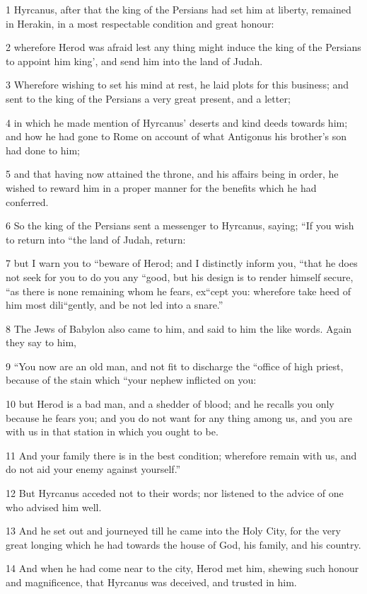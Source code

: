 1 Hyrcanus, after that the king of the Persians had set him at liberty, remained in Herakin, in a most respectable condition and great honour: 

2 wherefore Herod was afraid lest any thing might induce the king of the Persians to appoint him king’, and send him into the land of Judah. 

3 Wherefore wishing to set his mind at rest, he laid plots for this business; and sent to the king of the Persians a very great present, and a letter; 

4 in which he made mention of Hyrcanus’ deserts and kind deeds towards him; and how he had gone to Rome on account of what Antigonus his brother’s son had done to him; 

5 and that having now attained the throne, and his affairs being in order, he wished to reward him in a proper manner for the benefits which he had conferred. 

6 So the king of the Persians sent a messenger to Hyrcanus, saying; “If you wish to return into “the land of Judah, return: 

7 but I warn you to “beware of Herod; and I distinctly inform you, “that he does not seek for you to do you any “good, but his design is to render himself secure, “as there is none remaining whom he fears, ex“cept you: wherefore take heed of him most dili“gently, and be not led into a snare.” 

8 The Jews of Babylon also came to him, and said to him the like words. Again they say to him, 

9 “You now are an old man, and not fit to discharge the “office of high priest, because of the stain which “your nephew inflicted on you: 

10 but Herod is a bad man, and a shedder of blood; and he recalls you only because he fears you; and you do not want for any thing among us, and you are with us in that station in which you ought to be. 

11 And your family there is in the best condition; wherefore remain with us, and do not aid your enemy against yourself.” 

12 But Hyrcanus acceded not to their words; nor listened to the advice of one who advised him well. 

13 And he set out and journeyed till he came into the Holy City, for the very great longing which he had towards the house of God, his family, and his country. 

14 And when he had come near to the city, Herod met him, shewing such honour and magnificence, that Hyrcanus was deceived, and trusted in him. 


